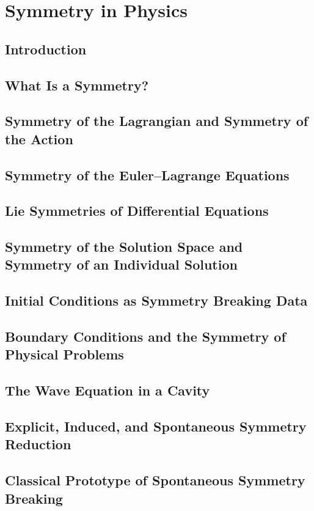 \chapter {Symmetry in Physics}
\label{sp}
\section{ Introduction}
\label{sp:in}
\section{ What Is a Symmetry?}
\label{sp:ws}
\section{ Symmetry of the Lagrangian and Symmetry of the Action}
\label{sp:sa}
\section{Symmetry of the Euler--Lagrange Equations}
\label{sp:eq}
\section{ Lie Symmetries of Differential Equations}
\label{sp:lie}
\section{Symmetry of the Solution Space and Symmetry of an Individual Solution}
\label{sp:sol}
\section{ Initial Conditions as Symmetry Breaking Data}
\label{sp:ic}
\section{Boundary Conditions and the Symmetry of Physical Problems}
\label{sp:bc}
\section{ The Wave Equation in a Cavity}
\label{sp:we}
\section{Explicit, Induced, and Spontaneous Symmetry Reduction}
\label{sp:sr}
\section{ Classical Prototype of Spontaneous Symmetry Breaking}
\label{sp:ssb1}
